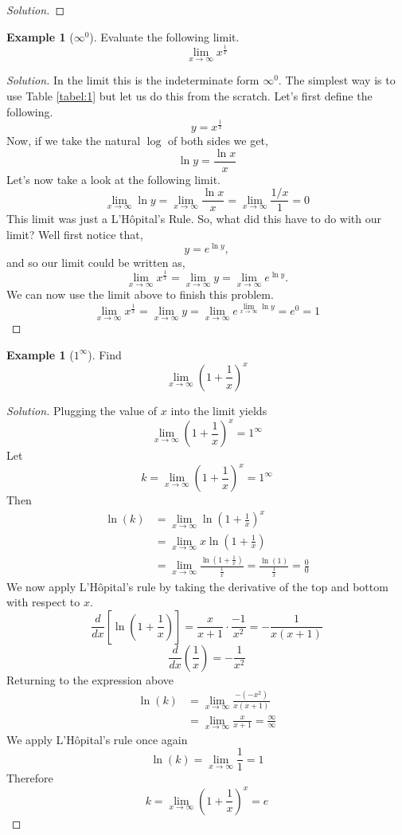 \documentclass[a4paper]{amsproc}
\theoremstyle{plain}
\numberwithin{equation}{section} %
\numberwithin{figure}{section} %
\theoremstyle{plain}
\theoremstyle{definition}
\newtheorem{example}[thm]{Example}
\theoremstyle{definition}
\theoremstyle{remark}
\begin{document}
\begin{proof}[Solution]

\end{proof}

\begin{example}[$\infty^0$]\label{exm:6}
Evaluate the following limit.
\[\lim_{x\to \infty}x^{\frac{1}{x}}\]
\end{example}

\begin{proof}[Solution]
In the limit this is the indeterminate form $\infty^0$. The simplest way is to use Table \ref{tabel:1} but let us do this from the scratch.
Let's first define the following.
\[y=x^{\frac{1}{x}}\]
Now, if we take the natural $\log$ of both sides we get,
\[\ln y=\frac{\ln x}{x}\]
Let's now take a look at the following limit.
\[\lim_{x\to \infty}\ln y=\lim_{x\to \infty}\frac{\ln x}{x}=\lim_{x\to \infty}\frac{1/x}{1}=0\]
This limit was just a L'H\^{o}pital's Rule. So, what did this have to do with our limit?
Well first notice that,
\[y=e^{\ln y},\]
and so our limit could be written as,
\[\lim_{x\to \infty}x^{\frac{1}{x}}=\lim_{x\to \infty}y=\lim_{x\to \infty}e^{\ln y}.\]
We can now use the limit above to finish this problem.
\[\lim_{x\to \infty}x^{\frac{1}{x}}=\lim_{x\to \infty}y=\lim_{x\to \infty}e^{\lim_{x\to \infty}\ln y}=e^{0}=1\]
\end{proof}

\begin{example}[$1^\infty$]\label{exm:7}
Find
\[
\lim_{x\to\infty}\left(1+\frac{1}{x}\right)^x
\]
\end{example}

\begin{proof}[Solution]
Plugging the value of $x$ into the limit yields
\[\lim_{x\to\infty}\left(1+\frac{1}{x}\right)^x=1^\infty\]
Let
\[k=\lim_{x\to\infty}\left(1+\frac{1}{x}\right)^x=1^\infty\]
Then
\begin{align*}
\ln(k)&=\lim_{x\to\infty}\ln\left(1+\frac{1}{x}\right)^x\\
      &=\lim_{x\to\infty}x\ln\left(1+\frac{1}{x}\right)\\
      &=\lim_{x\to\infty}\frac{\ln\left(1+\frac{1}{x}\right)}{\frac{1}{x}}=\frac{\ln(1)}{\frac{1}{x}}=\frac{0}{0}
\end{align*}
We now apply L'H\^{o}pital's rule by taking the derivative of the top and bottom with respect to $x$.
\[\frac{d}{dx}\left[\ln\left(1+\frac{1}{x}\right)\right]=\frac{x}{x+1}\cdot\frac{-1}{x^2}=-\frac{1}{x(x+1)}\]
\[\frac{d}{dx}\left(\frac{1}{x}\right)=-\frac{1}{x^2}\]
Returning to the expression above
\begin{align*}
\ln(k) &=\lim_{x\to\infty}\frac{-(-x^2)}{x(x+1)}\\
       &=\lim_{x\to\infty}\frac{x}{x+1}=\frac{\infty}{\infty}
\end{align*}
We apply L'H\^{o}pital's rule once again
\[\ln(k)=\lim_{x\to\infty}\frac{1}{1}=1\]
Therefore
\[k= \lim_{x\to\infty}\left(1+\frac{1}{x}\right)^x=e \]
\end{proof}
\end{document}
